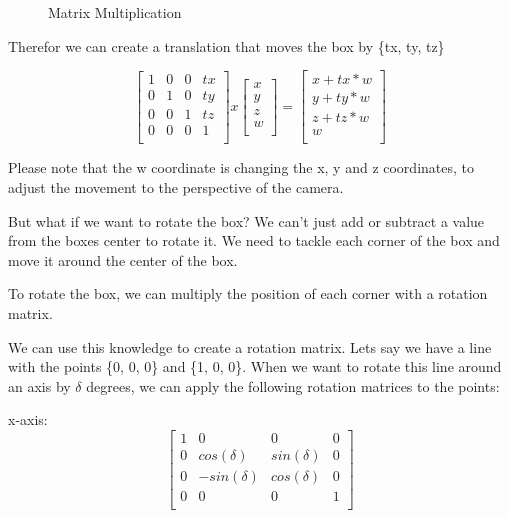 \documentclass[12pt]{report} \usepackage{preamble}
\begin{document}
\begin{figure}[hbtp]
	\centering 
	\caption{Matrix Multiplication \cite{fig:matrix-multiplication}}
\end{figure}
\FloatBarrier

Therefor we can create a translation that moves the box by \{tx, ty, tz\}

\[
	\begin{bmatrix}
		1 & 0 & 0 & tx \\
		0 & 1 & 0 & ty \\
		0 & 0 & 1 & tz \\
		0 & 0 & 0 & 1  \\
	\end{bmatrix}
	x
	\begin{bmatrix}
		x \\
		y \\
		z \\
		w \\
	\end{bmatrix}
	=
	\begin{bmatrix}
		x + tx*w \\
		y + ty*w \\
		z + tz*w \\
		w        \\
	\end{bmatrix}
\]

Please note that the w coordinate is changing the x, y and z coordinates,
to adjust the movement to the perspective of the camera.

But what if we want to rotate the box? We can't just add or
subtract a value from the boxes center to rotate it. We need to tackle each
corner of the box and move it around the center of the box.

To rotate the box, we can multiply the position of each corner with a
rotation matrix.

We can use this knowledge to create a rotation matrix. Lets say we have a line with
the points \{0, 0, 0\} and \{1, 0, 0\}.
When we want to rotate this line around an axis by \(\delta\) degrees, we can apply
the following rotation matrices to the points:

x-axis: \[
	\begin{bmatrix}
		1 & 0            & 0           & 0 \\
		0 & cos(\delta)  & sin(\delta) & 0 \\
		0 & -sin(\delta) & cos(\delta) & 0 \\
		0 & 0            & 0           & 1 \\
	\end{bmatrix}
\]
\end{document}
